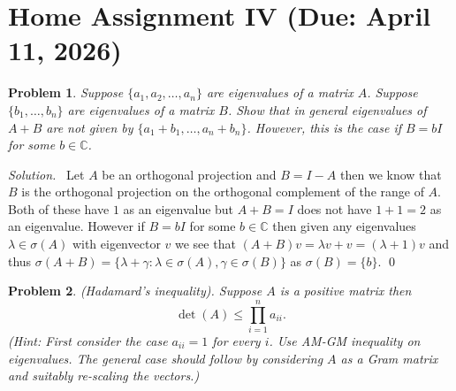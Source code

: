 \documentclass[12pt,a4paper]{article}
\newenvironment{solution}{%
  \par\noindent\textit{Solution.}\ }{\qed}
\theoremstyle{problemstyle}
\newtheorem{problem}{Problem}[section]
\def\bC{\mathbb{C}}
\begin{document}
\section{Home Assignment IV (Due: April 11, 2026)}
\begin{problem}\label{prob:4-1}
Suppose $\{a_1, a_2, \ldots, a_n\}$ are eigenvalues of a matrix $A$. Suppose $\{b_1, \ldots, b_n\}$ are eigenvalues of a matrix $B$. Show that in general eigenvalues of $A + B$ are not given by $\{a_1 + b_1, \ldots, a_n + b_n\}$. However, this is the case if $B = bI$ for some $b \in \mathbb{C}$.
\end{problem}
\begin{solution}
    Let $A$ be an orthogonal projection and $B=I-A$ then we know that $B$ is the orthogonal projection on the orthogonal complement of the range of $A$. 
	Both of these have $1$ as an eigenvalue but $A+B=I$ does not have $1+1=2$ as an eigenvalue. 
	However if $B=bI$ for some $b\in\bC$ then given any eigenvalues $\lambda\in\sigma(A)$ with eigenvector $v$ we see that $(A+B)v=\lambda v+v=(\lambda+1)v$ and thus $\sigma(A+B)=\{\lambda+\gamma:\lambda\in\sigma(A),\gamma\in\sigma(B)\}$ as $\sigma(B)=\{b\}$. 
\end{solution}
\begin{problem}\label{prob:4-2}
(Hadamard's inequality). Suppose $A$ is a positive matrix then
\[
\det(A) \leq \prod_{i=1}^{n} a_{ii}.
\]
(Hint: First consider the case $a_{ii} = 1$ for every $i$. Use AM-GM inequality on eigenvalues. The general case should follow by considering $A$ as a Gram matrix and suitably re-scaling the vectors.)
\end{problem}
\end{document}
